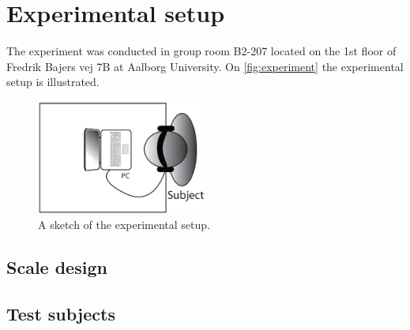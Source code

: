 \section*{Experimental setup}
%

The experiment was conducted in group room B2-207 located on the 1st floor of Fredrik Bajers vej 7B at Aalborg University. On \autoref{fig:experiment} the experimental setup is illustrated. 
%
\begin{figure}[H]
\centering
\includegraphics[width = 0.5\textwidth]{Figure/experiment.png} 
\caption{A sketch of the experimental setup.}
\label{fig:experiment}
\end{figure}
%
\subsection*{Scale design}

\subsection*{Test subjects}
